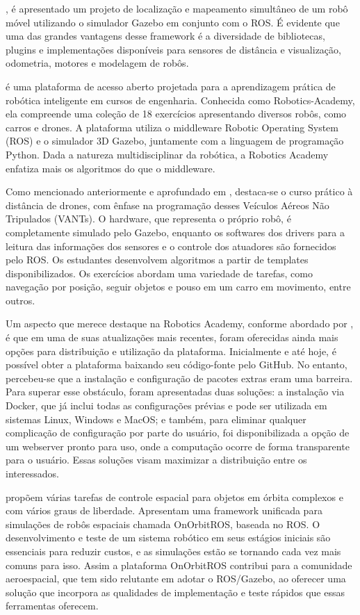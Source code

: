 , é apresentado um projeto de localização e mapeamento simultâneo de um robô móvel utilizando o simulador Gazebo em conjunto com o ROS. É evidente que uma das grandes vantagens desse framework é a diversidade de bibliotecas, plugins e implementações disponíveis para sensores de distância e visualização, odometria, motores e modelagem de robôs.

 é uma plataforma de acesso aberto projetada para a aprendizagem prática de robótica inteligente em cursos de engenharia. Conhecida como Robotics-Academy, ela compreende uma coleção de 18 exercícios apresentando diversos robôs, como carros e drones. A plataforma utiliza o middleware Robotic Operating System (ROS) e o simulador 3D Gazebo, juntamente com a linguagem de programação Python. Dada a natureza multidisciplinar da robótica, a Robotics Academy enfatiza mais os algoritmos do que o middleware.

Como mencionado anteriormente e aprofundado em , destaca-se o curso prático à distância de drones, com ênfase na programação desses Veículos Aéreos Não Tripulados (VANTs). O hardware, que representa o próprio robô, é completamente simulado pelo Gazebo, enquanto os softwares dos drivers para a leitura das informações dos sensores e o controle dos atuadores são fornecidos pelo ROS. Os estudantes desenvolvem algoritmos a partir de templates disponibilizados. Os exercícios abordam uma variedade de tarefas, como navegação por posição, seguir objetos e pouso em um carro em movimento, entre outros.

Um aspecto que merece destaque na Robotics Academy, conforme abordado por , é que em uma de suas atualizações mais recentes, foram oferecidas ainda mais opções para distribuição e utilização da plataforma. Inicialmente e até hoje, é possível obter a plataforma baixando seu código-fonte pelo GitHub. No entanto, percebeu-se que a instalação e configuração de pacotes extras eram uma barreira. Para superar esse obstáculo, foram apresentadas duas soluções: a instalação via Docker, que já inclui todas as configurações prévias e pode ser utilizada em sistemas Linux, Windows e MacOS; e também, para eliminar qualquer complicação de configuração por parte do usuário, foi disponibilizada a opção de um webserver pronto para uso, onde a computação ocorre de forma transparente para o usuário. Essas soluções visam maximizar a distribuição entre os interessados.

 propõem várias tarefas de controle espacial para objetos em órbita complexos e com vários graus de liberdade. Apresentam uma framework unificada para simulações de robôs espaciais chamada OnOrbitROS, baseada no ROS. O desenvolvimento e teste de um sistema robótico em seus estágios iniciais são essenciais para reduzir custos, e as simulações estão se tornando cada vez mais comuns para isso. Assim a plataforma OnOrbitROS contribui para a comunidade aeroespacial, que tem sido relutante em adotar o ROS/Gazebo, ao oferecer uma solução que incorpora as qualidades de implementação e teste rápidos que essas ferramentas oferecem.

